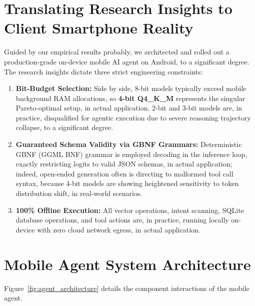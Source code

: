 \documentclass[12pt,a4paper,oneside]{report}
\begin{document}
    \section{Translating Research Insights to Client Smartphone Reality}
    Guided by our empirical results probably, we architected and rolled out a production-grade on-device mobile AI agent on Android, to a significant degree. The research insights dictate three strict engineering constraints:
    \begin{enumerate}
        \item \textbf{Bit-Budget Selection:} Side by side, 8-bit models typically exceed mobile background RAM allocations, so \textbf{4-bit Q4\_K\_M} represents the singular Pareto-optimal setup, in actual application. 2-bit and 3-bit models are, in practice, disqualified for agentic execution due to severe reasoning trajectory collapse, to a significant degree.
        \item \textbf{Guaranteed Schema Validity via GBNF Grammars:} Deterministic GBNF (GGML BNF) grammar is employed decoding in the inference loop, exactly restricting logits to valid JSON schemas, in actual application; indeed, open-ended generation often is directing to malformed tool call syntax, because 4-bit models are showing heightened sensitivity to token distribution shift, in real-world scenarios.
        \item \textbf{100\% Offline Execution:} All vector operations, intent scanning, SQLite database operations, and tool actions are, in practice, running locally on-device with zero cloud network egress, in actual application.
    \end{enumerate}

    \section{Mobile Agent System Architecture}
    Figure~\ref{fig:agent_architecture} details the component interactions of the mobile agent.
\end{document}
